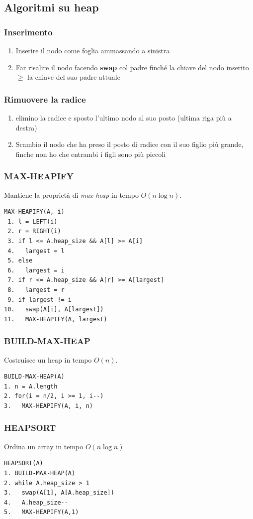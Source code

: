 \documentclass{article}
\begin{document}
\subsection*{Algoritmi su heap}
\subsubsection*{Inserimento}
\begin{enumerate}
  \item Inserire il nodo come foglia ammassando a sinistra
  \item Far risalire il nodo facendo \textbf{swap} col padre finché la chiave del nodo inserito \(\geq\) la chiave del suo padre attuale
\end{enumerate}
\subsubsection*{Rimuovere la radice}
\begin{enumerate}
  \item elimino la radice e sposto l'ultimo nodo al suo posto (ultima riga più a destra)
  \item Scambio il nodo che ha preso il posto di radice con il suo figlio più grande, finche non ho che entrambi i figli sono più piccoli
\end{enumerate}
\subsubsection*{MAX-HEAPIFY}
Mantiene la proprietà di \emph{max-heap} in tempo \(O(n \log n)\).
\begin{verbatim}
MAX-HEAPIFY(A, i)
 1. l = LEFT(i)
 2. r = RIGHT(i)
 3. if l <= A.heap_size && A[l] >= A[i]
 4.   largest = l
 5. else
 6.   largest = i
 7. if r <= A.heap_size && A[r] >= A[largest]
 8.   largest = r
 9. if largest != i
10.   swap(A[i], A[largest])
11.   MAX-HEAPIFY(A, largest)
\end{verbatim}
\subsubsection*{BUILD-MAX-HEAP}
Costruisce un heap in tempo \(O(n)\).
\begin{verbatim}
BUILD-MAX-HEAP(A)
1. n = A.length
2. for(i = n/2, i >= 1, i--)
3.   MAX-HEAPIFY(A, i, n)
\end{verbatim}
\subsubsection*{HEAPSORT}
Ordina un array in tempo \(O(n \log n)\)
\begin{verbatim}
HEAPSORT(A)
1. BUILD-MAX-HEAP(A)
2. while A.heap_size > 1
3.   swap(A[1], A[A.heap_size])
4.   A.heap_size--
5.   MAX-HEAPIFY(A,1)
\end{verbatim}
\pagebreak
\end{document}
